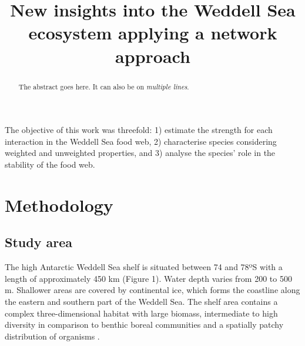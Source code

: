 \documentclass[gc, manuscript]{copernicus}
\begin{document}
\title{New insights into the Weddell Sea ecosystem applying a network
approach}









\received{}
\pubdiscuss{} %
\revised{}
\accepted{}
\published{}




\maketitle


\begin{abstract}
The abstract goes here. It can also be on \emph{multiple lines}.
\end{abstract}




\introduction[Introduction]

The objective of this work was threefold: 1) estimate the strength for
each interaction in the Weddell Sea food web, 2) characterise species
considering weighted and unweighted properties, and 3) analyse the
species' role in the stability of the food web.

\section{Methodology}

\subsection{Study area}

The high Antarctic Weddell Sea shelf is situated between 74 and 78ºS
with a length of approximately 450 km (Figure 1). Water depth varies
from 200 to 500 m. Shallower areas are covered by continental ice, which
forms the coastline along the eastern and southern part of the Weddell
Sea. The shelf area contains a complex three-dimensional habitat with
large biomass, intermediate to high diversity in comparison to benthic
boreal communities and a spatially patchy distribution of organisms
\citep{Dayton1990, Teixido2002}.
\end{document}
